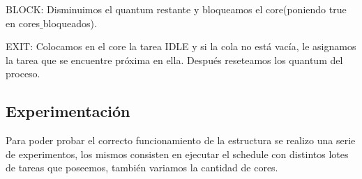 BLOCK: Disminuimos el quantum restante y bloqueamos el core(poniendo true en cores$\_$bloqueados).

EXIT: Colocamos en el core la tarea IDLE y si la cola no está vacía, le asignamos la tarea que se encuentre próxima en ella. Después reseteamos los quantum del proceso. 


\subsection{Experimentación}
Para poder probar el correcto funcionamiento de la estructura se realizo una serie de experimentos, los mismos consisten en ejecutar el schedule con distintos lotes de tareas que poseemos, también variamos la cantidad de cores. 
